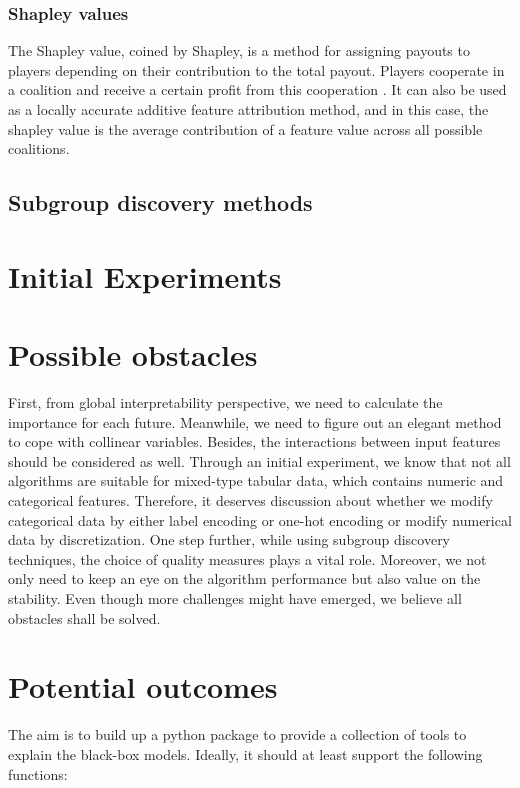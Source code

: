 \documentclass[runningheads]{llncs}
\begin{document}
	\subsubsection{Shapley values }
	The Shapley value, coined by Shapley, is a method for assigning payouts to players depending on their contribution to the total payout. Players cooperate in a coalition and receive a certain profit from this cooperation \cite{shapley1953value}. It can also be used as a locally accurate additive feature attribution method, and in this case, the shapley value is the average contribution of a feature value across all possible coalitions.
	
	\subsection{Subgroup discovery methods}
	
	
	\section{Initial Experiments}
	
	\section{Possible obstacles}
	
	First, from global interpretability perspective, we need to calculate the importance for each future. Meanwhile, we need to figure out an elegant method to cope with collinear variables. Besides, the interactions between input features should be considered as well. Through an initial experiment, we know that not all algorithms are suitable for mixed-type tabular data, which contains numeric and categorical features. Therefore, it deserves discussion about whether we modify categorical data by either label encoding or one-hot encoding or modify numerical data by discretization. One step further, while using subgroup discovery techniques, the choice of quality measures plays a vital role. Moreover, we not only need to keep an eye on the algorithm performance but also value on the stability. Even though more challenges might have emerged, we believe all obstacles shall be solved. 
	
	\section{Potential outcomes}
	
	The aim is to build up a python package to provide a collection of tools to explain the black-box models. Ideally, it should at least support the following functions:
	
\end{document}
